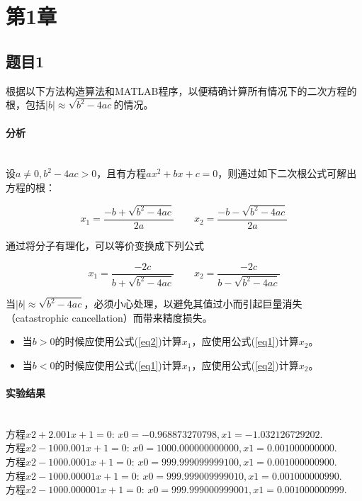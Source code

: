 \section{第1章}

\subsection{题目1}

根据以下方法构造算法和MATLAB程序，以便精确计算所有情况下的二次方程的根，包括$|b| \approx \sqrt{b^2 - 4ac}$的情况。

\paragraph{分析}
~\\

设$a \neq 0, b^2 - 4ac > 0$，且有方程$ax^2 + bx + c = 0$，则通过如下二次根公式可解出方程的根：

\begin{equation}
x_1=\frac{-b+\sqrt{b^2-4ac}}{2a}  \quad \quad x_2=\frac{-b-\sqrt{b^2-4ac}}{2a}
\label{eq1}
\tag{1}
\end{equation}

通过将分子有理化，可以等价变换成下列公式

\begin{equation}
x_1=\frac{-2c}{b+\sqrt{b^2-4ac}} \quad \quad x_2=\frac{-2c}{b-\sqrt{b^2-4ac}}
\label{eq2}
\tag{2}
\end{equation}

当$|b| \approx \sqrt{b^2 - 4ac}$，必须小心处理，以避免其值过小而引起巨量消失（catastrophic cancellation）而带来精度损失。

\begin{itemize}
	\item 当$b > 0$的时候应使用公式(\ref{eq2})计算$x_1$，应使用公式(\ref{eq1})计算$x_2$。
	\item 当$b < 0$的时候应使用公式(\ref{eq1})计算$x_1$，应使用公式(\ref{eq2})计算$x_2$。
\end{itemize}

\paragraph{实验结果}
~\\[.5em]
\noindent 方程$x2+2.001x+1=0$: $x0=−0.968873270798,x1=−1.032126729202$.\\
方程$x2−1000.001x+1=0$: $x0=1000.000000000000,x1=0.001000000000$.\\
方程$x2−1000.0001x+1=0$: $x0=999.999099999100,x1=0.001000000900$.\\
方程$x2−1000.00001x+1=0$: $x0=999.999009999010,x1=0.001000000990$.\\
方程$x2−1000.000001x+1=0$: $x0=999.999000999001,x1=0.001000000999$.\\

